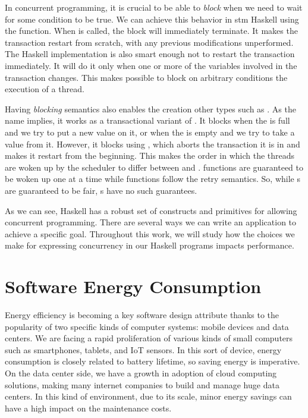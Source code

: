 In concurrent programming, it is crucial to be able to \emph{block} when we need to wait for some condition to be true. We can achieve this behavior in \acs{stm} Haskell using the \retry function. When \retry is called, the \atomically block will immediately terminate. It makes the transaction restart from scratch, with any previous modifications unperformed. The Haskell implementation is also smart enough not to restart the transaction immediately. It will do it only when one or more of the variables involved in the transaction changes. This makes possible to block on arbitrary conditions the execution of a thread.

Having \emph{blocking} semantics also enables the creation other types such as \TMVar. As the name implies, it works as a transactional variant of \MVar. It blocks when the \TMVar is full and we try to put a new value on it, or when the \TMVar is empty and we try to take a value from it. However, it blocks using \retry, which aborts the transaction it is in and makes it restart from the beginning. This makes the order in which the threads are woken up by the scheduler to differ between \MVar and \TMVar. \MVar functions are guaranteed to be woken up one at a time while \TMVar functions follow the retry semantics. So, while {\MVar}s are guaranteed to be fair, {\TMVar}s have no such guarantees.

As we can see, Haskell has a robust set of constructs and primitives for allowing concurrent programming. There are several ways we can write an application to achieve a specific goal. Throughout this work, we will study how the choices we make for expressing concurrency in our Haskell programs impacts performance.


\section{Software Energy Consumption}
Energy efficiency is becoming a key software design attribute thanks to the popularity of two specific kinds of computer systems: mobile devices and data centers. We are facing a rapid proliferation of various kinds of small computers such as smartphones, tablets, and IoT sensors. In this sort of device, energy consumption is closely related to battery lifetime, so saving energy is imperative. On the data center side, we have a growth in adoption of cloud computing solutions, making many internet companies to build and manage huge data centers. In this kind of environment, due to its scale, minor energy savings can have a high impact on the maintenance costs.

